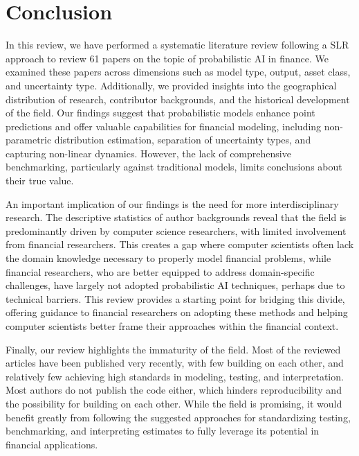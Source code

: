 \section{Conclusion}
\label{sec:conclusion}
In this review, we have performed a systematic literature review following a SLR approach to review 61 papers on the topic of probabilistic AI in finance. We examined these papers across dimensions such as model type, output, asset class, and uncertainty type. Additionally, we provided insights into the geographical distribution of research, contributor backgrounds, and the historical development of the field. Our findings suggest that probabilistic models enhance point predictions and offer valuable capabilities for financial modeling, including non-parametric distribution estimation, separation of uncertainty types, and capturing non-linear dynamics. However, the lack of comprehensive benchmarking, particularly against traditional models, limits conclusions about their true value.

An important implication of our findings is the need for more interdisciplinary research. The descriptive statistics of author backgrounds reveal that the field is predominantly driven by computer science researchers, with limited involvement from financial researchers. This creates a gap where computer scientists often lack the domain knowledge necessary to properly model financial problems, while financial researchers, who are better equipped to address domain-specific challenges, have largely not adopted probabilistic AI techniques, perhaps due to technical barriers. This review provides a starting point for bridging this divide, offering guidance to financial researchers on adopting these methods and helping computer scientists better frame their approaches within the financial context.

Finally, our review highlights the immaturity of the field. Most of the reviewed articles have been published very recently, with few building on each other, and relatively few achieving high standards in modeling, testing, and interpretation. Most authors do not publish the code either, which hinders reproducibility and the possibility for building on each other. While the field is promising, it would benefit greatly from following the suggested approaches for standardizing testing, benchmarking, and interpreting estimates to fully leverage its potential in financial applications.